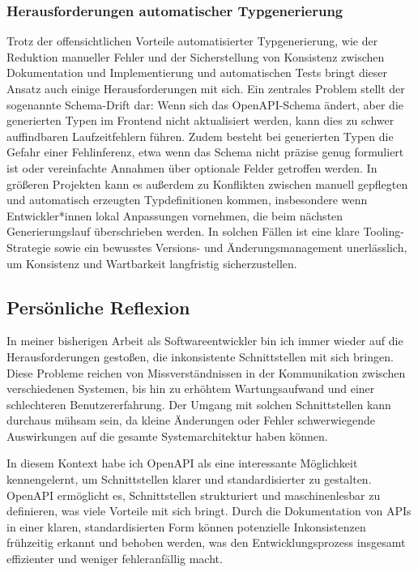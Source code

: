 \subsubsection{Herausforderungen automatischer Typgenerierung}

Trotz der offensichtlichen Vorteile automatisierter Typgenerierung, wie der Reduktion manueller Fehler
und der Sicherstellung von Konsistenz zwischen Dokumentation und Implementierung und automatischen Tests\cite{9159071}
bringt dieser Ansatz auch einige Herausforderungen mit sich. 
Ein zentrales Problem stellt der sogenannte Schema-Drift dar:
Wenn sich das OpenAPI-Schema ändert, aber die generierten Typen im Frontend nicht aktualisiert werden, 
kann dies zu schwer auffindbaren Laufzeitfehlern führen. 
Zudem besteht bei generierten Typen die Gefahr einer Fehlinferenz, 
etwa wenn das Schema nicht präzise genug formuliert ist oder vereinfachte Annahmen über optionale Felder getroffen werden.
In größeren Projekten kann es außerdem zu Konflikten zwischen manuell gepflegten und automatisch erzeugten Typdefinitionen kommen,
insbesondere wenn Entwickler*innen lokal Anpassungen vornehmen, 
die beim nächsten Generierungslauf überschrieben werden. 
In solchen Fällen ist eine klare Tooling-Strategie sowie ein bewusstes Versions- und Änderungsmanagement unerlässlich, 
um Konsistenz und Wartbarkeit langfristig sicherzustellen.

\subsection{Persönliche Reflexion}

In meiner bisherigen Arbeit als Softwareentwickler bin ich immer wieder auf die Herausforderungen gestoßen,
die inkonsistente Schnittstellen mit sich bringen. 
Diese Probleme reichen von Missverständnissen in der Kommunikation zwischen verschiedenen Systemen, 
bis hin zu erhöhtem Wartungsaufwand und einer schlechteren Benutzererfahrung. 
Der Umgang mit solchen Schnittstellen kann durchaus mühsam sein, 
da kleine Änderungen oder Fehler schwerwiegende Auswirkungen auf die gesamte Systemarchitektur haben können.

In diesem Kontext habe ich OpenAPI als eine interessante Möglichkeit kennengelernt, 
um Schnittstellen klarer und standardisierter zu gestalten. 
OpenAPI ermöglicht es, Schnittstellen strukturiert und maschinenlesbar zu definieren, was viele Vorteile mit sich bringt.
Durch die Dokumentation von APIs in einer klaren, standardisierten Form können potenzielle Inkonsistenzen frühzeitig erkannt 
und behoben werden, was den Entwicklungsprozess insgesamt effizienter und weniger fehleranfällig macht.

